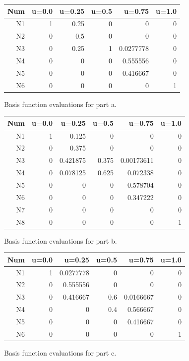 \documentclass[11pt,letterpaper]{article}
\begin{document}
\begin{figure}[!tbh]
\centering
\begin{tabular}{rrrrrr}
\hline
   Num & u=0.0 &   u=0.25 &   u=0.5 &    u=0.75 &   u=1.0 \\
\hline
   N1&    1 &     0.25 &       0 & 0         &       0 \\
   N2&    0 &     0.5  &       0 & 0         &       0 \\
   N3&    0 &     0.25 &       1 & 0.0277778 &       0 \\
   N4&    0 &     0    &       0 & 0.555556  &       0 \\
   N5&    0 &     0    &       0 & 0.416667  &       0 \\
   N6&    0 &     0    &       0 & 0         &       1 \\
\hline
\end{tabular}
\caption{Basis function evaluations for part a.}
\label{tab2}
\end{figure}


\begin{figure}[!tbh]
\centering
\begin{tabular}{rrrrrr}
\hline
  Num &  u=0.0 &   u=0.25 &   u=0.5 &     u=0.75 &   u=1.0 \\
\hline
  N1 &     1 & 0.125    &   0     & 0          &       0 \\
  N2 &     0 & 0.375    &   0     & 0          &       0 \\
  N3&     0 & 0.421875 &   0.375 & 0.00173611 &       0 \\
  N4&      0 & 0.078125 &   0.625 & 0.072338   &       0 \\
  N5&     0 & 0        &   0     & 0.578704   &       0 \\
  N6&     0 & 0        &   0     & 0.347222   &       0 \\
  N7&     0 & 0        &   0     & 0          &       0 \\
  N8&     0 & 0        &   0     & 0          &       1 \\
\hline
\end{tabular}
\caption{Basis function evaluations for part b.}
\label{tab3}
\end{figure}

\begin{figure}[!tbh]
\centering
\begin{tabular}{rrrrrr}
\hline
   Num & u=0.0 &    u=0.25 &   u=0.5 &    u=0.75 &   u=1.0 \\
\hline
   N1&    1 & 0.0277778 &     0   & 0         &       0 \\
   N2&    0 & 0.555556  &     0   & 0         &       0 \\
     N3&  0 & 0.416667  &     0.6 & 0.0166667 &       0 \\
    N4&   0 & 0         &     0.4 & 0.566667  &       0 \\
    N5&   0 & 0         &     0   & 0.416667  &       0 \\
    N6&   0 & 0         &     0   & 0         &       1 \\
\hline
\end{tabular}
\caption{Basis function evaluations for part c.}
\label{tab4}
\end{figure}
\end{document}
